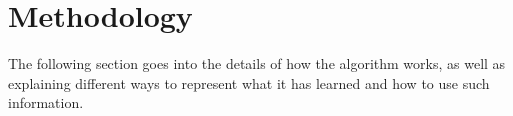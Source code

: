 \chapter{Methodology} \label{ch:meth}

The following section goes into the details of how the \mlblink algorithm works, as well as explaining different ways to represent what it has learned and how to use such information. 







